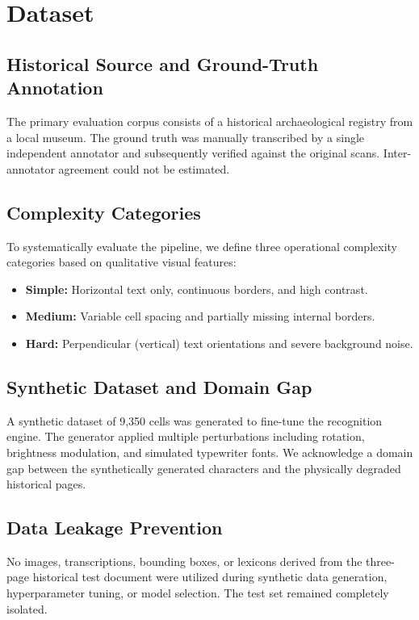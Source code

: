 \documentclass[pdflatex,sn-mathphys-num]{sn-jnl}
\begin{document}
\section{Dataset}
\label{sec:dataset}

\subsection{Historical Source and Ground-Truth Annotation}
The primary evaluation corpus consists of a historical archaeological registry from a local museum. The ground truth was manually transcribed by a single independent annotator and subsequently verified against the original scans. Inter-annotator agreement could not be estimated.

\subsection{Complexity Categories}
To systematically evaluate the pipeline, we define three operational complexity categories based on qualitative visual features:
\begin{itemize}
    \item \textbf{Simple:} Horizontal text only, continuous borders, and high contrast.
    \item \textbf{Medium:} Variable cell spacing and partially missing internal borders.
    \item \textbf{Hard:} Perpendicular (vertical) text orientations and severe background noise.
\end{itemize}

\subsection{Synthetic Dataset and Domain Gap}
A synthetic dataset of 9,350 cells was generated to fine-tune the recognition engine. The generator applied multiple perturbations including rotation, brightness modulation, and simulated typewriter fonts. We acknowledge a domain gap between the synthetically generated characters and the physically degraded historical pages.

\subsection{Data Leakage Prevention}
No images, transcriptions, bounding boxes, or lexicons derived from the three-page historical test document were utilized during synthetic data generation, hyperparameter tuning, or model selection. The test set remained completely isolated.
\end{document}
